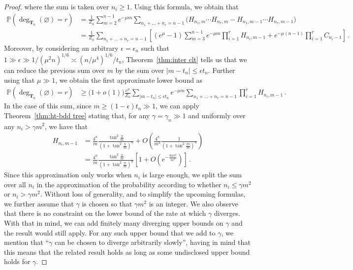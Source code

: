 \documentclass{article}
\newcommand{\pr}{\mathbb{P}}								%
\newcommand{\Prob}[1]{\pr\left(#1\right)}					%
\newcommand{\1}{\mathbbm{1}}								%
\theoremstyle{definition}
\numberwithin{equation}{section}
\begin{document}
\begin{proof}
    where the sum is taken over $n_i\geq1$.
    Using this formula, we obtain that
    \begin{align*}
        \Prob{\deg_{\mathbf{T}_n}(\varnothing)=r}
        &=\frac{1}{Z_n}\sum_{m=2}^{n-1}e^{-\mu m}\sum_{n_1+\ldots+n_r=n-1}\Big(H_{n_1,m}\cdots H_{n_r,m}-H_{n_1,m-1}\cdots H_{n_r,m-1}\Big)\\
        &=\frac{1}{Z_n}\sum_{n_1+\ldots+n_r=n-1}\left[(e^\mu-1)\sum_{m=3}^{n-1}e^{-\mu m}\prod_{i=1}^rH_{n_i,m-1}+e^{-\mu(n-1)}\prod_{i=1}^rC_{n_i-1}\right]\,.
    \end{align*}
    Moreover, by considering an arbitrary $\epsilon=\epsilon_n$ such that $1\gg\epsilon\gg1/(\mu^2n)^{1/6}\asymp (n/\mu^4)^{1/6}/t_n$, Theorem~\ref{thm:inter clt} tells us that we can reduce the previous sum over $m$ by the sum over $|m-t_n|\leq\epsilon t_n$.
    Further using that $\mu\gg1$, we obtain the first approximate lower bound as
    \begin{align*}
        \Prob{\deg_{\mathbf{T}_n}(\varnothing)=r}
        &\geq\big(1+o(1)\big)\frac{e^\mu}{Z_n}\sum_{|m-t_n|\leq\epsilon t_n}e^{-\mu m}\sum_{n_1+\ldots+n_r=n-1}\prod_{i=1}^rH_{n_i,m-1}\,.
    \end{align*}
    In the case of this sum, since $m\geq(1-\epsilon)t_n\gg1$, we can apply Theorem~\ref{thm:ht-bdd tree} stating that, for any $\gamma=\gamma_n\gg1$ and uniformly over any $n_i>\gamma m^2$, we have that
    \begin{align*}
        H_{n_i,m-1}
        &=\frac{4^n}{m}\frac{\tan^2\frac{\pi}{m}}{\left(1+\tan^2\frac{\pi}{m}\right)^n}+O\left(\frac{4^n}{m^3}\frac{1}{\left(1+\tan^2\frac{2\pi}{m}\right)^n}\right)\\
        &=\frac{4^n}{m}\frac{\tan^2\frac{\pi}{m}}{\left(1+\tan^2\frac{\pi}{m}\right)^n}\left[1+O\left(e^{-\frac{3n\pi^2}{m^2}}\right)\right]\,.
    \end{align*}
    Since this approximation only works when $n_i$ is large enough, we split the sum over all $n_i$ in the approximation of the probability according to whether $n_i\leq\gamma m^2$ or $n_i>\gamma m^2$.
    Without loss of generality, and to simplify the upcoming formulas, we further assume that $\gamma$ is chosen so that $\gamma m^2$ is an integer.
    We also observe that there is no constraint on the lower bound of the rate at which $\gamma$ diverges.
    With that in mind, we can add finitely many diverging upper bounds on $\gamma$ and the result would still apply.
    For any such upper bound that we add to $\gamma$, we mention that ``$\gamma$ can be chosen to diverge arbitrarily slowly'', having in mind that this means that the related result holds as long as some undisclosed upper bound holds for $\gamma$.
    

\end{proof}
\end{document}
